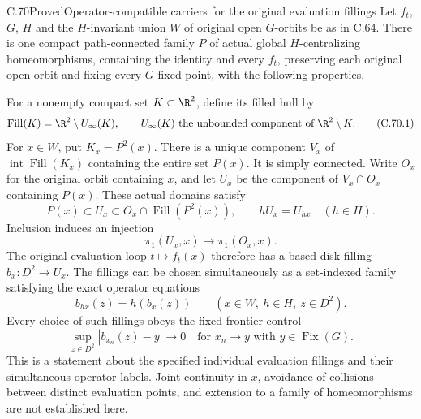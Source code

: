 \begin{claim}{C.70}{Proved}{Operator-compatible carriers for the original evaluation fillings}
Let $f_t$, $G$, $H$ and the $H$-invariant union $W$ of
original open $G$-orbits be as in C.64. There is one compact
path-connected family $P$ of actual global $H$-centralizing
homeomorphisms, containing the identity and every $f_t$,
preserving each original open orbit and fixing every
$G$-fixed point, with the following properties.

For a nonempty compact set $K\subset\R^2$, define its
filled hull by
\[
 \operatorname{Fill}(K)
   =\R^2\setminus U_\infty(K),
 \qquad U_\infty(K)\text{ the unbounded component of }\R^2\setminus K.
                                                               \tag{C.70.1}
\]
For $x\in W$, put $K_x=P^2(x)$. There is a unique
component $V_x$ of $\operatorname{int}\operatorname{Fill}(K_x)$
containing the entire set $P(x)$. It is simply connected.
Write $O_x$ for the original orbit containing $x$, and let
$U_x$ be the component of $V_x\cap O_x$ containing $P(x)$.
These actual domains satisfy
\[
 P(x)\subset U_x\subset O_x\cap\operatorname{Fill}(P^2(x)),
 \qquad hU_x=U_{hx}\quad(h\in H).
                                                               \tag{C.70.2}
\]
Inclusion induces an injection
\[
                  \pi_1(U_x,x)\longrightarrow\pi_1(O_x,x).
                                                               \tag{C.70.3}
\]
The original evaluation loop $t\mapsto f_t(x)$ therefore
has a based disk filling $b_x:D^2\to U_x$.
The fillings can be chosen simultaneously as a set-indexed
family satisfying the exact operator equations
\[
               b_{hx}(z)=h(b_x(z))
                    \qquad(x\in W,\ h\in H,\ z\in D^2).
                                                               \tag{C.70.4}
\]
Every choice of such fillings obeys the fixed-frontier control
\[
 \sup_{z\in D^2}|b_{x_n}(z)-y|\longrightarrow0
       \quad\text{for }x_n\to y\text{ with }y\in\operatorname{Fix}(G).
                                                               \tag{C.70.5}
\]
This is a statement about the specified individual evaluation
fillings and their simultaneous operator labels. Joint
continuity in $x$, avoidance of collisions between distinct
evaluation points, and extension to a family of homeomorphisms
are not established here.
\end{claim}
